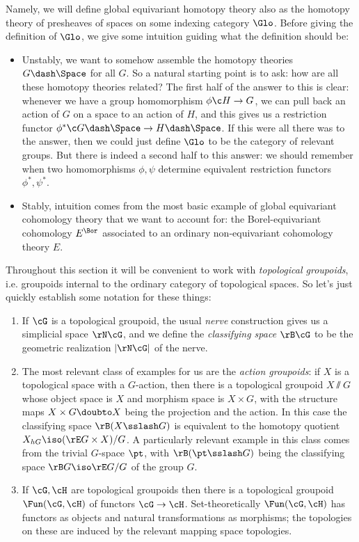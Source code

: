 Namely, we will define global equivariant homotopy theory also as the
homotopy theory of presheaves of spaces on some indexing category
$\Glo$. Before giving the definition of $\Glo$, we give some intuition
guiding what the definition should be:
\begin{itemize}
\item Unstably, we want to somehow assemble the homotopy theories
  $G\dash\Space$ for all $G$. So a natural starting point is to ask:
  how are all these homotopy theories related? The first half of the
  answer to this is clear: whenever we have a group homomorphism
  $\phi \c H \to G$, we can pull back an action of $G$ on a space to
  an action of $H$, and this gives us a restriction functor
  $\phi^* \c G\dash\Space \to H\dash\Space$. If this were all there
  was to the answer, then we could just define $\Glo$ to be the
  category of relevant groups. But there is indeed a second half to
  this answer: we should remember when two homomorphisms $\phi,\psi$
  determine equivalent restriction functors $\phi^*,\psi^*$.
\item Stably, intuition comes from the most basic example of global
  equivariant cohomology theory  that we want to account for: the
  Borel-equivariant cohomology $E^\Bor$ associated to an ordinary
  non-equivariant cohomology theory $E$.
\end{itemize}

\begin{notation}
  \label{global-topgpds}
  Throughout this section it will be convenient to work with
  \emph{topological groupoids}, i.e. groupoids internal to the
  ordinary category of topological spaces. So let's just quickly
  establish some notation for these things:
  \begin{enumerate}
  \item If $\cG$ is a topological groupoid, the usual \emph{nerve}
    construction gives us a simplicial space $\rN\cG$, and we define
    the \emph{classifying space} $\rB\cG$ to be the geometric
    realization $|\rN\cG|$ of the nerve.
  \item The most relevant class of examples for us are the
    \emph{action groupoids}: if $X$ is a topological space with a
    $G$-action, then there is a topological groupoid $X \sslash G$
    whose object space is $X$ and morphism space is $X \times G$, with
    the structure maps $X \times G \doubto X$ being the projection and
    the action. In this case the classifying space $\rB(X \sslash G)$
    is equivalent to the homotopy quotient
    $X_{hG} \iso (\rE G \times X)/G$. A particularly relevant example
    in this class comes from the trivial $G$-space $\pt$, with
    $\rB(\pt \sslash G)$ being the classifying space
    $\rB G \iso \rE G/G$ of the group $G$.
  \item If $\cG,\cH$ are topological groupoids then there is a
    topological groupoid $\Fun(\cG,\cH)$ of functors $\cG \to \cH$.
    Set-theoretically $\Fun(\cG,\cH)$ has functors as objects and
    natural transformations as morphisms; the topologies on these are
    induced by the relevant mapping space topologies.
  \end{enumerate}
\end{notation}

